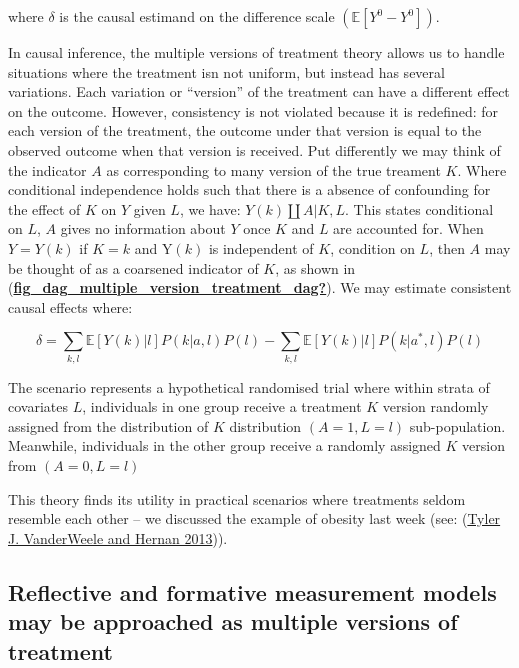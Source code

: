 \documentclass[
  singlecolumn]{report}
\begin{document}
where \(\delta\) is the causal estimand on the difference scale
\((\mathbb{E}[Y^0 - Y^0])\).

In causal inference, the multiple versions of treatment theory allows us
to handle situations where the treatment isn not uniform, but instead
has several variations. Each variation or ``version'' of the treatment
can have a different effect on the outcome. However, consistency is not
violated because it is redefined: for each version of the treatment, the
outcome under that version is equal to the observed outcome when that
version is received. Put differently we may think of the indicator \(A\)
as corresponding to many version of the true treament \(K\). Where
conditional independence holds such that there is a absence of
confounding for the effect of \(K\) on \(Y\) given \(L\), we have:
\(Y(k)\coprod A|K,L\). This states conditional on \(L\), \(A\) gives no
information about \(Y\) once \(K\) and \(L\) are accounted for. When
\(Y = Y(k)\) if \(K = k\) and Y\((k)\) is independent of \(K\),
condition on \(L\), then \(A\) may be thought of as a coarsened
indicator of \(K\), as shown in
(\protect\hyperlink{ref-fig_dag_multiple_version_treatment_dag}{\textbf{fig\_dag\_multiple\_version\_treatment\_dag?}}).
We may estimate consistent causal effects where:

\[ \delta = \sum_{k,l} \mathbb{E}[Y(k)|l] P(k|a,l) P(l) - \sum_{k,l} \mathbb{E}[Y(k)|l] P(k|a^*,l) P(l)\]

The scenario represents a hypothetical randomised trial where within
strata of covariates \(L\), individuals in one group receive a treatment
\(K\) version randomly assigned from the distribution of \(K\)
distribution \((A = 1, L = l)\) sub-population. Meanwhile, individuals
in the other group receive a randomly assigned \(K\) version from
\((A = 0, L = l)\)

This theory finds its utility in practical scenarios where treatments
seldom resemble each other -- we discussed the example of obesity last
week (see: (\protect\hyperlink{ref-vanderweele2013}{Tyler J. VanderWeele
and Hernan 2013})).

\hypertarget{reflective-and-formative-measurement-models-may-be-approached-as-multiple-versions-of-treatment}{%
\subsection{Reflective and formative measurement models may be
approached as multiple versions of
treatment}\label{reflective-and-formative-measurement-models-may-be-approached-as-multiple-versions-of-treatment}}
\end{document}
